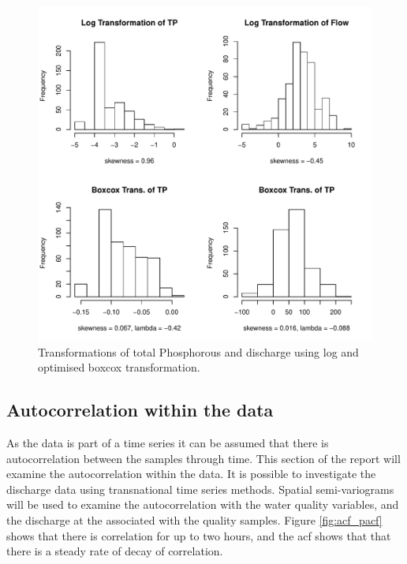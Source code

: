 \documentclass[5p]{elsarticle}
\begin{document}
\begin{center}
\begin{figure}
\includegraphics[scale=0.45]{tp_flow_trans.pdf}
\caption{Transformations of total Phosphorous and discharge using log and optimised boxcox transformation.}
\label{fig:transformations}
\end{figure}
\end{center}

\subsection*{Autocorrelation within the data}
As the data is part of a time series it can be assumed that there is autocorrelation between the samples through time. This section of the report will examine the autocorrelation within the data. It is possible to investigate the discharge data using transnational time series methods. Spatial semi-variograms will be used to examine the autocorrelation with the water quality variables, and the discharge at the associated with the quality samples. Figure \ref{fig:acf_pacf} shows that there is correlation for up to two hours, and the acf shows that that there is a steady rate of decay of correlation. 
\end{document}
